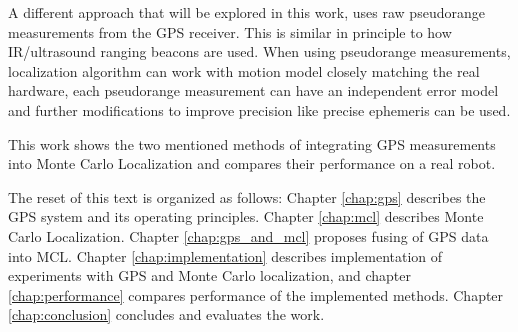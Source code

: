 A different approach that will be explored in this work, uses raw
pseudorange measurements from the GPS receiver.
This is similar in principle to how IR/ultrasound ranging beacons are used.
When using pseudorange measurements, localization algorithm can work with motion model closely
matching the real hardware, each pseudorange measurement can have an
independent error model and further modifications to improve precision like precise
ephemeris can be used.


\vspace{1.5em}


This work shows the two mentioned  methods of integrating GPS measurements
into Monte Carlo Localization and compares their performance on a real robot.

The reset of this text is organized as follows:
Chapter \ref{chap:gps} describes the GPS system and its operating principles.
Chapter \ref{chap:mcl} describes Monte Carlo Localization.
Chapter \ref{chap:gps_and_mcl} proposes fusing of GPS data into MCL.
Chapter \ref{chap:implementation} describes implementation of experiments with GPS and
Monte Carlo localization,
and chapter \ref{chap:performance} compares performance of the implemented methods.
Chapter \ref{chap:conclusion} concludes and evaluates the work.
